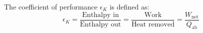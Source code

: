 The coefficient of performance \( \epsilon_K \) is defined as:  
\[
\epsilon_K = \frac{\text{Enthalpy in}}{\text{Enthalpy out}} = \frac{\text{Work}}{\text{Heat removed}} = \frac{W_{\text{net}}}{Q_{\text{ab}}}
\]